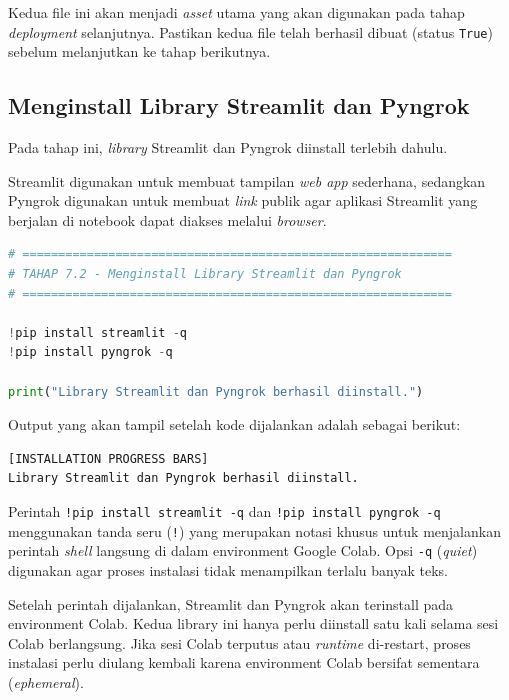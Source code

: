 Kedua file ini akan menjadi \textit{asset} utama yang akan digunakan pada tahap \textit{deployment} selanjutnya. Pastikan kedua file telah berhasil dibuat (status \texttt{True}) sebelum melanjutkan ke tahap berikutnya.

\subsection{Menginstall Library Streamlit dan Pyngrok}

Pada tahap ini, \textit{library} Streamlit dan Pyngrok diinstall terlebih dahulu.

Streamlit digunakan untuk membuat tampilan \textit{web app} sederhana, sedangkan Pyngrok digunakan untuk membuat \textit{link} publik agar aplikasi Streamlit yang berjalan di notebook dapat diakses melalui \textit{browser}.

\begin{lstlisting}[language=Python, caption=Menginstall Streamlit dan Pyngrok]
# ============================================================
# TAHAP 7.2 - Menginstall Library Streamlit dan Pyngrok
# ============================================================

!pip install streamlit -q
!pip install pyngrok -q

print("Library Streamlit dan Pyngrok berhasil diinstall.")
\end{lstlisting}

Output yang akan tampil setelah kode dijalankan adalah sebagai berikut:

\begin{outputcode}[H]
\begin{lstlisting}[language={}]
[INSTALLATION PROGRESS BARS]
Library Streamlit dan Pyngrok berhasil diinstall.
\end{lstlisting}
\caption{Output instalasi Streamlit dan Pyngrok}
\end{outputcode}

Perintah \texttt{!pip install streamlit -q} dan \texttt{!pip install pyngrok -q} menggunakan tanda seru (\texttt{!}) yang merupakan notasi khusus untuk menjalankan perintah \textit{shell} langsung di dalam environment Google Colab. Opsi \texttt{-q} (\textit{quiet}) digunakan agar proses instalasi tidak menampilkan terlalu banyak teks.

Setelah perintah dijalankan, Streamlit dan Pyngrok akan terinstall pada environment Colab. Kedua library ini hanya perlu diinstall satu kali selama sesi Colab berlangsung. Jika sesi Colab terputus atau \textit{runtime} di-restart, proses instalasi perlu diulang kembali karena environment Colab bersifat sementara (\textit{ephemeral}).

